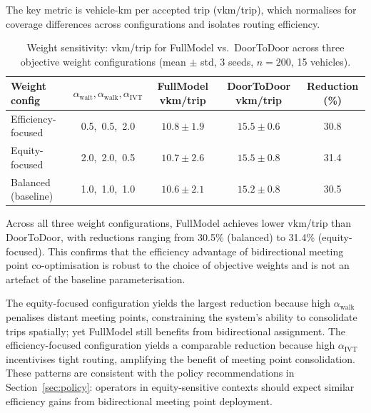 The key metric is vehicle-km per accepted trip (vkm/trip), which normalises
for coverage differences across configurations and isolates routing efficiency.

\begin{table}[h]
\centering
\caption{Weight sensitivity: vkm/trip for FullModel vs.\ DoorToDoor across three
         objective weight configurations (mean $\pm$ std, 3 seeds, $n=200$, 15 vehicles).}
\label{tab:weight-sensitivity}
\begin{tabular}{lcccc}
\toprule
Weight config & $\alpha_{\text{wait}}, \alpha_{\text{walk}}, \alpha_{\text{IVT}}$ &
FullModel vkm/trip & DoorToDoor vkm/trip & Reduction (\%) \\
\midrule
Efficiency-focused & 0.5,\ 0.5,\ 2.0 & $10.8 \pm 1.9$ & $15.5 \pm 0.6$ & 30.8 \\
Equity-focused     & 2.0,\ 2.0,\ 0.5 & $10.7 \pm 2.6$ & $15.5 \pm 0.8$ & 31.4 \\
Balanced (baseline)& 1.0,\ 1.0,\ 1.0 & $10.6 \pm 2.1$ & $15.2 \pm 0.8$ & 30.5 \\
\bottomrule
\end{tabular}
\end{table}

Across all three weight configurations, FullModel achieves lower vkm/trip than
DoorToDoor, with reductions ranging from 30.5\% (balanced) to 31.4\%
(equity-focused). This confirms that the efficiency advantage of bidirectional
meeting point co-optimisation is robust to the choice of objective weights and
is not an artefact of the baseline parameterisation.

The equity-focused configuration yields the largest reduction because high
$\alpha_{\text{walk}}$ penalises distant meeting points, constraining the
system's ability to consolidate trips spatially; yet FullModel still benefits
from bidirectional assignment. The efficiency-focused configuration yields a
comparable reduction because high $\alpha_{\text{IVT}}$ incentivises tight
routing, amplifying the benefit of meeting point consolidation.
These patterns are consistent with the policy recommendations in
Section~\ref{sec:policy}: operators in equity-sensitive contexts should expect
similar efficiency gains from bidirectional meeting point deployment.
